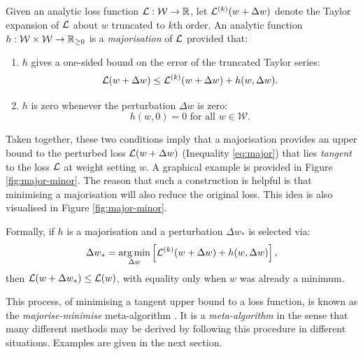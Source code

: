 \begin{refsection}
\begin{definition}[Majorisation]\label{def:majorisation} Given an analytic loss function $\mathcal{L}:\mathcal{W}\to\mathbb{R}$, let $\mathcal{L}^{(k)}(w+\Delta w)$ denote the Taylor expansion of $\mathcal{L}$ about $w$ truncated to $k$th order. An analytic function $h:\mathcal{W}\times\mathcal{W}\to\mathbb{R}_{\geq0}$ is a \textit{majorisation} of $\mathcal{L}$ provided that:
\begin{enumerate}[label=(\roman*)]
    \item $h$ gives a one-sided bound on the error of the truncated Taylor series:
    \begin{equation}\label{eq:major}
    \mathcal{L}(w+\Delta w) \leq \mathcal{L}^{(k)}(w+\Delta w) + h(w,\Delta w).
    \end{equation}
    \item $h$ is zero whenever the perturbation $\Delta w$ is zero:
    \begin{equation}
        h(w, 0) = 0 \text{ for all } w\in\mathcal{W}.
    \end{equation}
\end{enumerate}
\end{definition}

Taken together, these two conditions imply that a majorisation provides an upper bound to the perturbed loss $\mathcal{L}(w+\Delta w)$ (Inequality \ref{eq:major}) that lies \textit{tangent} to the loss $\mathcal{L}$ at weight setting $w$. A graphical example is provided in Figure \ref{fig:major-minor}. The reason that such a construction is helpful is that minimising a majorisation will also reduce the original loss. This idea is also visualised in Figure \ref{fig:major-minor}.

Formally, if $h$ is a majorisation and a perturbation $\Delta w_*$ is selected via:
\begin{equation}\label{eq:minor}
    \Delta w_* =\operatorname*{arg\,min}_{\Delta w} \left[\mathcal{L}^{(k)}(w+\Delta w) +  h(w,\Delta w) \right],
\end{equation}
then $\mathcal{L}(w+\Delta w_*) \leq \mathcal{L}(w)$, with equality only when $w$ was already a minimum.

This process, of minimising a tangent upper bound to a loss function, is known as the \textit{majorise-minimise} meta-algorithm \citep{mm}. It is a \textit{meta-algorithm} in the sense that many different methods may be derived by following this procedure in different situations. Examples are given in the next section.


\end{refsection}
